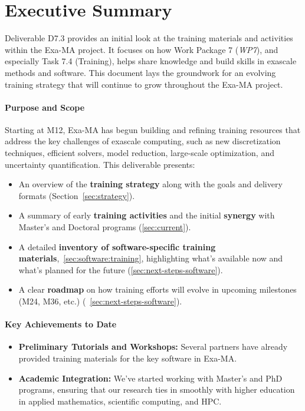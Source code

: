 \section*{Executive Summary}

Deliverable D7.3 provides an initial look at the training materials and activities within the Exa-MA project. It focuses on how Work Package 7 (\textit{WP7}), and especially Task 7.4 (Training), helps share knowledge and build skills in exascale methods and software. This document lays the groundwork for an evolving training strategy that will continue to grow throughout the Exa-MA project.

\paragraph{Purpose and Scope}
Starting at M12, Exa-MA has begun building and refining training resources that address the key challenges of exascale computing, such as new discretization techniques, efficient solvers, model reduction, large-scale optimization, and uncertainty quantification. This deliverable presents:
\begin{itemize}
    \item An overview of the \textbf{training strategy} along with the goals and delivery formats (Section~\cref{sec:strategy}).
    \item A summary of early \textbf{training activities} and the initial \textbf{synergy} with Master's and Doctoral programs (\cref{sec:current}).
    \item A detailed \textbf{inventory of software-specific training materials},~\cref{sec:software:training}, highlighting what's available now and what's planned for the future (\cref{sec:next-steps-software}).
    \item A clear \textbf{roadmap} on how training efforts will evolve in upcoming milestones (M24, M36, etc.) (~\cref{sec:next-steps-software}).
\end{itemize}

\paragraph{Key Achievements to Date}
\begin{itemize}
    \item \textbf{Preliminary Tutorials and Workshops:} Several partners have already provided training materials for the key software in Exa-MA.
    \item \textbf{Academic Integration:} We've started working with Master's and PhD programs, ensuring that our research ties in smoothly with higher education in applied mathematics, scientific computing, and HPC.
\end{itemize}

